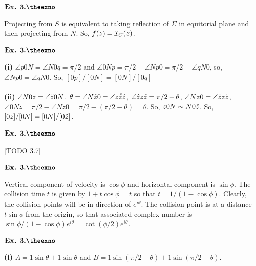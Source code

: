 \documentclass{article}
\def\tf{\textbf}
\def\mc{\ensuremath\mathcal}
\def\td{\ensuremath\tilde}
\newcounter{exno}
\begin{document}
\vspace{0.2in}

${\textbf{Ex. 3.\theexno}}$
\addtocounter{exno}{1}

Projecting from $S$ is equivalent to taking reflection of $\Sigma$ in equitorial plane and then projecting from $N$. So, $f(z)=\mc{I}_C(z)$.

\vspace{0.2in}

${\textbf{Ex. 3.\theexno}}$
\addtocounter{exno}{1}

\tf{(i)} $\angle p0N = \angle N0q = \pi/2$ and $\angle 0Np = \pi/2-\angle Np0 = \pi/2 - \angle qN0$, so, $\angle Np0 = \angle qN0$. So, $[0p]/[0N] = [0N]/[0q]$\\~\\

\tf{(ii)} $\angle N0z = \angle \td{z}0N$. $\theta = \angle N\td{z}0 = \angle z \hat{\td{z}} \hat{z}$, $\angle \hat{z}z\td{z} = \pi/2-\theta$, $\angle Nz0 = \angle \hat{z}z\td{z}$, $\angle 0Nz = \pi/2-\angle Nz0 = \pi/2-(\pi/2-\theta)= \theta$. So, $z0N \sim N0\td{z}$. So, $[0z]/[0N] = [0N]/[0\td{z}]$.

\vspace{0.2in}

${\textbf{Ex. 3.\theexno}}$
\addtocounter{exno}{1}

[TODO 3.7]

\vspace{0.2in}

${\textbf{Ex. 3.\theexno}}$
\addtocounter{exno}{1}

Vertical component of velocity is $\cos\phi$ and horizontal component is $\sin\phi$. The collision time $t$ is given by $1+t\cos\phi = t$ so that $t = 1/(1-\cos\phi)$. Clearly, the collision points will be in direction of $e^{i\theta}$. The collision point is at a distance $t\sin\phi$ from the origin, so that associated complex number is $\sin\phi/(1-\cos\phi)e^{i\theta} = \cot(\phi/2)e^{i\theta}$.

\vspace{0.2in}

${\textbf{Ex. 3.\theexno}}$
\addtocounter{exno}{1}

\tf{(i)} $A = 1\sin\theta + 1\sin\theta$ and $B = 1\sin(\pi/2-\theta) + 1\sin(\pi/2-\theta)$.\\~\\
\end{document}
